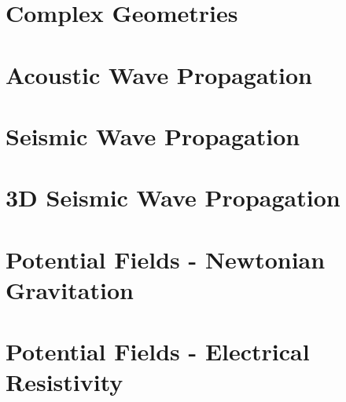 \documentclass{esysdoc}
\begin{document}
\chapter{Complex Geometries}
 \label{CHAP HEAT 2}
 
 
\chapter{Acoustic Wave Propagation}
% 
\chapter{Seismic Wave Propagation}
 

\chapter{3D Seismic Wave Propagation}
 
 
\chapter{Potential Fields - Newtonian Gravitation}
 
%  
\chapter{Potential Fields - Electrical Resistivity}
 





\appendix
%
\printindex
\end{document}

